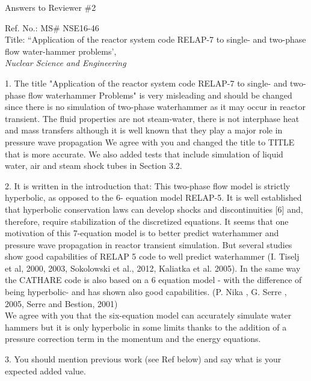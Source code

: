 \documentclass{article}
\begin{document}
\begin{center}
{ \Large Answers to Reviewer \#2}
\end{center}

\bigskip

\noindent Ref. No.: MS\# NSE16-46\\
Title: ``Application of the reactor system code RELAP-7 to single- and two-phase flow water-hammer problems', \\
{\it Nuclear Science and Engineering}\\

\bigskip
\bigskip

{\color{blue}
1. The title "Application of the reactor system code RELAP-7 to single- and two-phase flow waterhammer Problems" is very misleading and should be changed since there is no simulation of two-phase waterhammer as it may occur in reactor transient. The fluid properties are not steam-water, there is not interphase heat and mass transfers although it is well known that they play a major role in pressure wave propagation
}
We agree with you and changed the title to TITLE that is more accurate. We also added tests that include simulation of liquid water, air and steam shock tubes in Section 3.2. 
\bigskip

{\color{blue}
2. It is written in the introduction that:
This two-phase flow model is strictly hyperbolic, as opposed to the 6- equation model RELAP-5. It is well established that hyperbolic conservation laws can develop shocks and discontinuities [6] and, therefore, require stabilization of the discretized equations.
It seems that one motivation of this 7-equation model is to better predict waterhammer and pressure wave propagation in reactor transient simulation. But several studies show good capabilities of RELAP 5 code to well predict waterhammer (I. Tiselj et al, 2000, 2003, Sokolowski et al., 2012, Kaliatka et al. 2005). In the same way the CATHARE code is also based on a 6 equation model - with the difference of being hyperbolic- and has shown also good capabilities. (P. Nika , G. Serre , 2005, Serre and Bestion, 2001) \\
}
We agree with you that the six-equation model can accurately simulate water hammers but it is only hyperbolic in some limits thanks to the addition of a pressure correction term in the momentum and the energy equations.
\bigskip

{\color{blue}
3. You should mention previous work (see Ref below) and say what is your expected added value. \\
}
\end{document}
